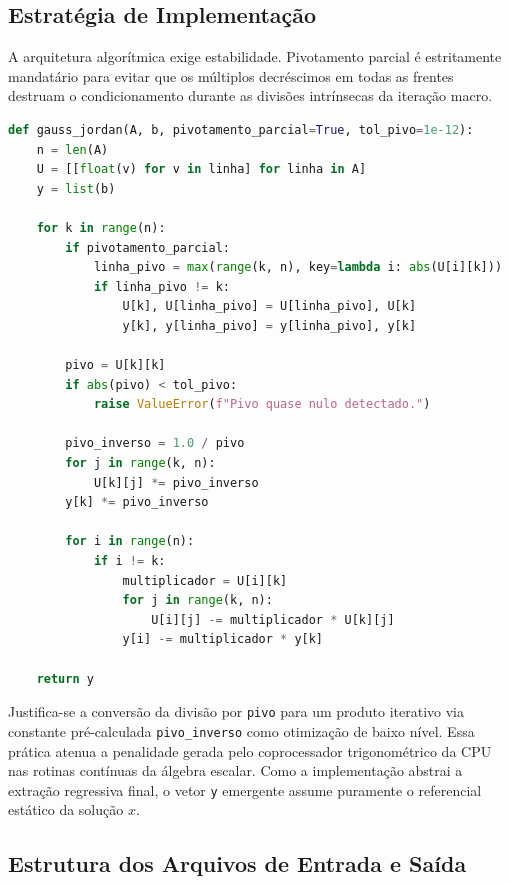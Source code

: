 \subsection{Estratégia de Implementação}

A arquitetura algorítmica exige estabilidade. Pivotamento parcial é estritamente mandatário para evitar que os múltiplos decréscimos em todas as frentes destruam o condicionamento durante as divisões intrínsecas da iteração macro.

\begin{lstlisting}[language=Python, caption={Resolução de Sistemas via Eliminação Universal Gauss-Jordan}, label={lst:gauss_jordan}]
def gauss_jordan(A, b, pivotamento_parcial=True, tol_pivo=1e-12):
    n = len(A)
    U = [[float(v) for v in linha] for linha in A]
    y = list(b)

    for k in range(n):
        if pivotamento_parcial:
            linha_pivo = max(range(k, n), key=lambda i: abs(U[i][k]))
            if linha_pivo != k:
                U[k], U[linha_pivo] = U[linha_pivo], U[k]
                y[k], y[linha_pivo] = y[linha_pivo], y[k]

        pivo = U[k][k]
        if abs(pivo) < tol_pivo:
            raise ValueError(f"Pivo quase nulo detectado.")

        pivo_inverso = 1.0 / pivo
        for j in range(k, n):
            U[k][j] *= pivo_inverso
        y[k] *= pivo_inverso
        
        for i in range(n):
            if i != k:
                multiplicador = U[i][k]
                for j in range(k, n):
                    U[i][j] -= multiplicador * U[k][j]
                y[i] -= multiplicador * y[k]

    return y
\end{lstlisting}

Justifica-se a conversão da divisão por \texttt{pivo} para um produto iterativo via constante pré-calculada \texttt{pivo\_inverso} como otimização de baixo nível. Essa prática atenua a penalidade gerada pelo coprocessador trigonométrico da CPU nas rotinas contínuas da álgebra escalar. Como a implementação abstrai a extração regressiva final, o vetor \texttt{y} emergente assume puramente o referencial estático da solução $x$.

\subsection{Estrutura dos Arquivos de Entrada e Saída}

